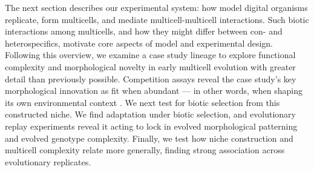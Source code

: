 The next section describes our experimental system: how model digital organisms replicate, form multicells, and mediate multicell-multicell interactions.
Such biotic interactions among multicells, and how they might differ between con- and heterospecifics, motivate core aspects of model and experimental design.
Following this overview, we examine a case study lineage to explore functional complexity and morphological novelty in early multicell evolution with greater detail than previously possible.
Competition assays reveal the case study's key morphological innovation as fit when abundant --- in other words, when shaping its own environmental context \citep{matthews2014under}.
We next test for biotic selection from this constructed niche.
We find adaptation under biotic selection, and evolutionary replay experiments reveal it acting to lock in evolved morphological patterning and evolved genotype complexity.
Finally, we test how niche construction and multicell complexity relate more generally, finding strong association across evolutionary replicates.









